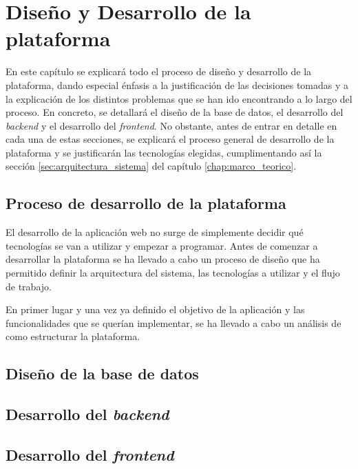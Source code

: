\chapter{Diseño y Desarrollo de la plataforma}
\label{chap:diseno_desarrollo}

En este capítulo se explicará todo el proceso de diseño y desarrollo de la plataforma, dando especial énfasis a la justificación de las decisiones tomadas y a la explicación de los distintos problemas que se han ido encontrando a lo largo del proceso. En concreto, se detallará el diseño de la base de datos, el desarrollo del \textit{backend} y el desarrollo del \textit{frontend}. No obstante, antes de entrar en detalle en cada una de estas secciones, se explicará el proceso general de desarrollo de la plataforma y se justificarán las tecnologías elegidas, cumplimentando así la sección \ref{sec:arquitectura_sistema} del capítulo \ref{chap:marco_teorico}.



\section{Proceso de desarrollo de la plataforma}
\label{sec:proceso_desarrollo}

El desarrollo de la aplicación web no surge de simplemente decidir qué tecnologías se van a utilizar y empezar a programar. Antes de comenzar a desarrollar la plataforma se ha llevado a cabo un proceso de diseño que ha permitido definir la arquitectura del sistema, las tecnologías a utilizar y el flujo de trabajo.

En primer lugar y una vez ya definido el objetivo de la aplicación y las funcionalidades que se querían implementar, se ha llevado a cabo un análisis de como estructurar la plataforma.

\section{Diseño de la base de datos}


\section{Desarrollo del \textit{backend}}


\section{Desarrollo del \textit{frontend}}